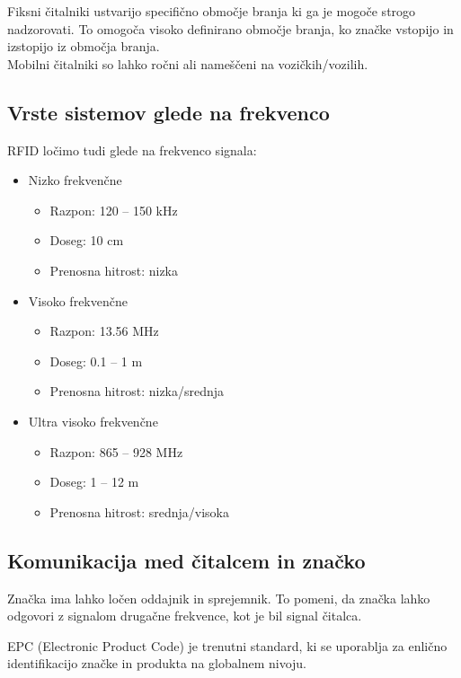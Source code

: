 \documentclass[]{article}
\begin{document}
\noindent
Fiksni \v{c}italniki ustvarijo specifi\v{c}no obmo\v{c}je branja ki
ga je mogo\v{c}e strogo nadzorovati. To omogo\v{c}a visoko definirano
obmo\v{c}je branja, ko zna\v{c}ke vstopijo in izstopijo iz območja
branja. \\
Mobilni \v{c}italniki so lahko ro\v{c}ni ali name\v{s}\v{c}eni na
vozi\v{c}kih/vozilih.

\subsection{Vrste sistemov glede na frekvenco}
RFID lo\v{c}imo tudi glede na frekvenco signala:
\begin{itemize}
  \item Nizko frekvenčne
    \begin{itemize}
      \item Razpon: 120 – 150 kHz
      \item Doseg: 10 cm
      \item Prenosna hitrost: nizka
    \end{itemize}
  \item Visoko frekvenčne
    \begin{itemize}
      \item Razpon: 13.56 MHz
      \item Doseg: 0.1 – 1 m
      \item Prenosna hitrost: nizka/srednja
    \end{itemize}
  \item Ultra visoko frekvenčne
    \begin{itemize}
      \item Razpon: 865 – 928 MHz
      \item Doseg: 1 – 12 m
      \item Prenosna hitrost: srednja/visoka
    \end{itemize}
\end{itemize}

\subsection{Komunikacija med \v{c}italcem in zna\v{c}ko}
Zna\v{c}ka ima lahko lo\v{c}en oddajnik in sprejemnik. To pomeni, da
zna\v{c}ka lahko odgovori z signalom druga\v{c}ne frekvence, kot je
bil signal \v{c}italca.

EPC (Electronic Product Code) je trenutni standard, ki se uporablja
za enli\v{c}no identifikacijo zna\v{c}ke in produkta na globalnem
nivoju. \\
\end{document}
